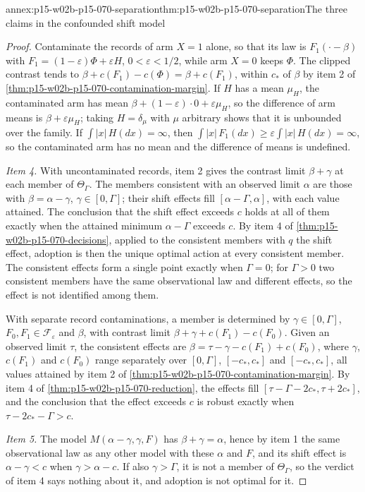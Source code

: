 \begin{annexitem}{annex:p15-w02b-p15-070-separation}{thm:p15-w02b-p15-070-separation}{The three claims in the confounded shift model}
\begin{proof}
Contaminate the records of arm \(X=1\) alone, so that its law is
\(F_1(\cdot-\beta)\) with \(F_1=(1-\varepsilon)\Phi+\varepsilon H\),
\(0<\varepsilon<1/2\), while arm \(X=0\) keeps \(\Phi\). The clipped
contrast tends to \(\beta+c(F_1)-c(\Phi)=\beta+c(F_1)\), within \(c_*\)
of \(\beta\) by item 2 of
\cref{thm:p15-w02b-p15-070-contamination-margin}. If \(H\) has a mean
\(\mu_H\), the contaminated arm has mean
\(\beta+(1-\varepsilon)\cdot0+\varepsilon\mu_H\), so the difference of
arm means is \(\beta+\varepsilon\mu_H\); taking \(H=\delta_{\mu}\) with
\(\mu\) arbitrary shows that it is unbounded over the family. If
\(\int|x|\,H(dx)=\infty\), then
\(\int|x|\,F_1(dx)\geq\varepsilon\int|x|\,H(dx)=\infty\), so the
contaminated arm has no mean and the difference of means is undefined.

\emph{Item 4.} With uncontaminated records, item 2 gives the contrast limit
\(\beta+\gamma\) at each member of \(\Theta_\Gamma\). The members
consistent with an observed limit \(\alpha\) are those with
\(\beta=\alpha-\gamma\), \(\gamma\in[0,\Gamma]\); their shift effects
fill \([\alpha-\Gamma,\alpha]\), with each value attained. The
conclusion that the shift effect exceeds \(c\) holds at all of them
exactly when the attained minimum \(\alpha-\Gamma\) exceeds \(c\). By
item 4 of \cref{thm:p15-w02b-p15-070-decisions}, applied to the
consistent members with \(q\) the shift effect, adoption is then the
unique optimal action at every consistent member. The consistent effects
form a single point exactly when \(\Gamma=0\); for \(\Gamma>0\) two
consistent members have the same observational law and different
effects, so the effect is not identified among them.

With separate record contaminations, a member is determined by
\(\gamma\in[0,\Gamma]\), \(F_0,F_1\in\mathcal F_\varepsilon\) and
\(\beta\), with contrast limit \(\beta+\gamma+c(F_1)-c(F_0)\). Given an
observed limit \(\tau\), the consistent effects are
\(\beta=\tau-\gamma-c(F_1)+c(F_0)\), where \(\gamma\), \(c(F_1)\) and
\(c(F_0)\) range separately over \([0,\Gamma]\), \([-c_*,c_*]\) and
\([-c_*,c_*]\), all values attained by item 2 of
\cref{thm:p15-w02b-p15-070-contamination-margin}. By item 4 of
\cref{thm:p15-w02b-p15-070-reduction}, the effects fill
\([\tau-\Gamma-2c_*,\tau+2c_*]\), and the conclusion that the effect
exceeds \(c\) is robust exactly when \(\tau-2c_*-\Gamma>c\).

\emph{Item 5.} The model \(M(\alpha-\gamma,\gamma,F)\) has
\(\beta+\gamma=\alpha\), hence by item 1 the same observational law as
any other model with these \(\alpha\) and \(F\), and its shift effect is
\(\alpha-\gamma<c\) when \(\gamma>\alpha-c\). If also \(\gamma>\Gamma\),
it is not a member of \(\Theta_\Gamma\), so the verdict of item 4 says
nothing about it, and adoption is not optimal for it.
\end{proof}
\end{annexitem}
